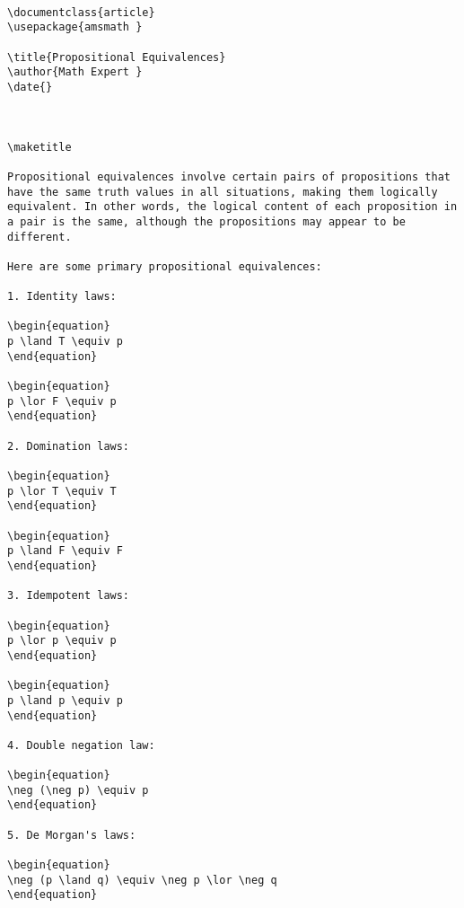 \begin{verbatim}

\documentclass{article}
\usepackage{amsmath }

\title{Propositional Equivalences}
\author{Math Expert }
\date{}



\maketitle

Propositional equivalences involve certain pairs of propositions that have the same truth values in all situations, making them logically equivalent. In other words, the logical content of each proposition in a pair is the same, although the propositions may appear to be different.

Here are some primary propositional equivalences:

1. Identity laws:

\begin{equation}
p \land T \equiv p
\end{equation}

\begin{equation}
p \lor F \equiv p
\end{equation}

2. Domination laws:

\begin{equation}
p \lor T \equiv T
\end{equation}

\begin{equation}
p \land F \equiv F
\end{equation}

3. Idempotent laws:

\begin{equation}
p \lor p \equiv p
\end{equation}

\begin{equation}
p \land p \equiv p
\end{equation}

4. Double negation law:

\begin{equation}
\neg (\neg p) \equiv p
\end{equation}

5. De Morgan's laws:

\begin{equation}
\neg (p \land q) \equiv \neg p \lor \neg q
\end{equation}


\end{verbatim}
